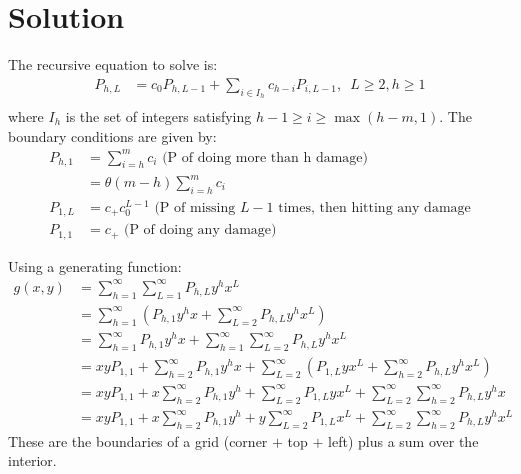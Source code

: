 	\section{Solution}
		The recursive equation to solve is:
		\begin{align}
			P_{h, L} &= c_0P_{h, L - 1} + \sum_{i\in I_h} c_{h-i} P_{i, L-1},\,\,\, L \ge 2, h \ge 1\\ %
		\end{align}
		where $I_h$ is the set of integers satisfying $h - 1 \ge i \ge \max(h - m, 1)$. The boundary conditions are given by:
		\begin{align}
			P_{h, 1} &= \sum_{i=h}^m c_i \text{ (P of doing more than h damage)} \\
			 &= \theta(m - h) \sum_{i=h}^m c_i \\
			P_{1, L} &= c_+ c_0^{L-1} \text{ (P of missing $L-1$ times, then hitting any damage}\\
			P_{1, 1} &= c_+ \text{ (P of doing any damage)}
		\end{align}
		
		Using a generating function:
		\begin{align}
			g(x, y) &= \sum_{h=1}^\infty\sum_{L=1}^\infty P_{h, L} y^h x^L \\
			&= \sum_{h=1}^\infty\left(P_{h, 1} y^h x + \sum_{L=2}^\infty P_{h, L} y^h x^L \right)\\
			&= \sum_{h=1}^\infty P_{h, 1} y^h x + \sum_{h=1}^\infty\sum_{L=2}^\infty P_{h, L} y^h x^L\\
			&= xyP_{1, 1} + \sum_{h=2}^\infty P_{h, 1} y^h x + \sum_{L=2}^\infty\left( P_{1,L} yx^L + \sum_{h=2}^\infty P_{h, L} y^h x^L \right)\\
			&= xyP_{1, 1}  + x\sum_{h=2}^\infty P_{h, 1} y^h + \sum_{L=2}^\infty P_{1,L} yx^L + \sum_{L=2}^\infty\sum_{h=2}^\infty P_{h, L} y^h x \\
			&= xyP_{1, 1}  + x\sum_{h=2}^\infty P_{h, 1} y^h  + y\sum_{L=2}^\infty P_{1,L} x^L + \sum_{L=2}^\infty\sum_{h=2}^\infty P_{h, L} y^hx^L
		\end{align}
		These are the boundaries of a grid (corner $+$ top $+$ left) plus a sum over the interior. 

